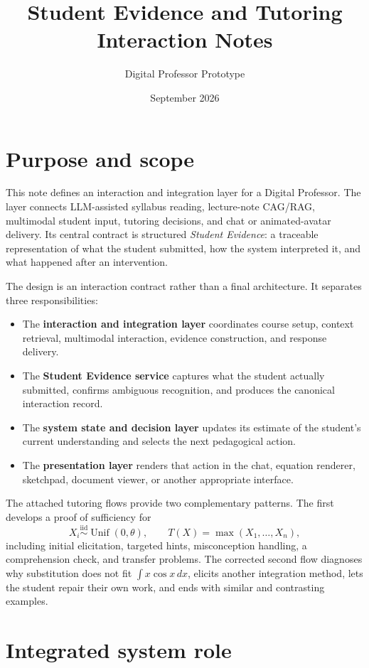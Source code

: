 \documentclass[11pt]{article}
\title{Student Evidence and Tutoring Interaction Notes}
\author{Digital Professor Prototype}
\date{September 2026}
\begin{document}
\maketitle
\tableofcontents
\section{Purpose and scope}

This note defines an interaction and integration layer for a Digital Professor. The layer connects LLM-assisted syllabus reading, lecture-note CAG/RAG, multimodal student input, tutoring decisions, and chat or animated-avatar delivery. Its central contract is structured \emph{Student Evidence}: a traceable representation of what the student submitted, how the system interpreted it, and what happened after an intervention.

The design is an interaction contract rather than a final architecture. It separates three responsibilities:

\begin{itemize}
    \item The \textbf{interaction and integration layer} coordinates course setup, context retrieval, multimodal interaction, evidence construction, and response delivery.
    \item The \textbf{Student Evidence service} captures what the student actually submitted, confirms ambiguous recognition, and produces the canonical interaction record.
    \item The \textbf{system state and decision layer} updates its estimate of the student's current understanding and selects the next pedagogical action.
    \item The \textbf{presentation layer} renders that action in the chat, equation renderer, sketchpad, document viewer, or another appropriate interface.
\end{itemize}

The attached tutoring flows provide two complementary patterns. The first develops a proof of sufficiency for
\[
X_i \overset{\mathrm{iid}}{\sim} \operatorname{Unif}(0,\theta),
\qquad T(X)=\max(X_1,\ldots,X_n),
\]
including initial elicitation, targeted hints, misconception handling, a comprehension check, and transfer problems. The corrected second flow diagnoses why substitution does not fit $\int x\cos x\,dx$, elicits another integration method, lets the student repair their own work, and ends with similar and contrasting examples.

\section{Integrated system role}
\end{document}
